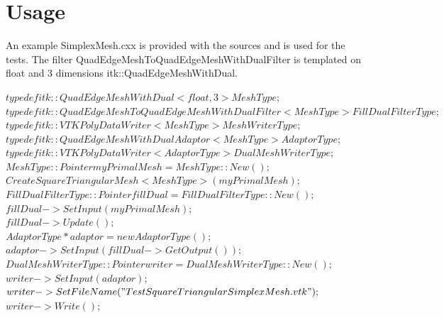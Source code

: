 \documentclass{InsightArticle}
\begin{document}
\section{Usage}
An example SimplexMesh.cxx is provided with the sources and is used for the tests. The filter QuadEdgeMeshToQuadEdgeMeshWithDualFilter is templated on float and 3 dimensions itk::QuadEdgeMeshWithDual. 

  $typedef itk::QuadEdgeMeshWithDual< float, 3 > MeshType;$ \\
  $typedef itk::QuadEdgeMeshToQuadEdgeMeshWithDualFilter< MeshType >  FillDualFilterType; $\\

  $typedef itk::VTKPolyDataWriter< MeshType > MeshWriterType;$\\
  $typedef itk::QuadEdgeMeshWithDualAdaptor< MeshType >  AdaptorType;$\\
  $typedef itk::VTKPolyDataWriter< AdaptorType > DualMeshWriterType;$\\

  $MeshType::Pointer myPrimalMesh = MeshType::New();$\\
  $CreateSquareTriangularMesh< MeshType >( myPrimalMesh );$\\

  $FillDualFilterType::Pointer fillDual = FillDualFilterType::New();$\\
  $fillDual->SetInput( myPrimalMesh );$\\
  $fillDual->Update( );$\\

  $AdaptorType* adaptor = new AdaptorType();$\\
  $adaptor->SetInput( fillDual->GetOutput() );$\\

  $DualMeshWriterType::Pointer writer = DualMeshWriterType::New();$\\
  $writer->SetInput( adaptor );$\\
  $writer->SetFileName( "TestSquareTriangularSimplexMesh.vtk" );$\\
  $writer->Write();$\\
 


\end{document}
